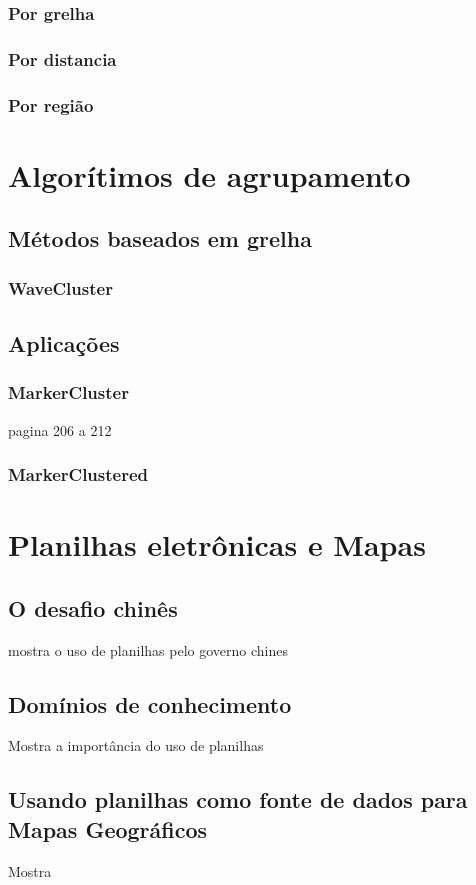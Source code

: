 		\subsubsection{Por grelha}
		\subsubsection{Por distancia}
		\subsubsection{Por região}
		
\section{Algorítimos de agrupamento}
	\subsection{Métodos baseados em grelha}
		\subsubsection{WaveCluster}
	\subsection{Aplicações}
		\subsubsection{MarkerCluster}
		pagina 206 a 212
		\subsubsection{MarkerClustered}



\section{Planilhas eletrônicas e Mapas}
\subsection{O desafio chinês}
mostra o uso de planilhas pelo governo chines \cite{chinaPlanilha}
\subsection{Domínios de conhecimento}
Mostra a importância do uso de planilhas \cite{credinePlanilha} 
\subsection{Usando planilhas como fonte de dados para Mapas Geográficos}
Mostra \cite{lieberman2009spatio}